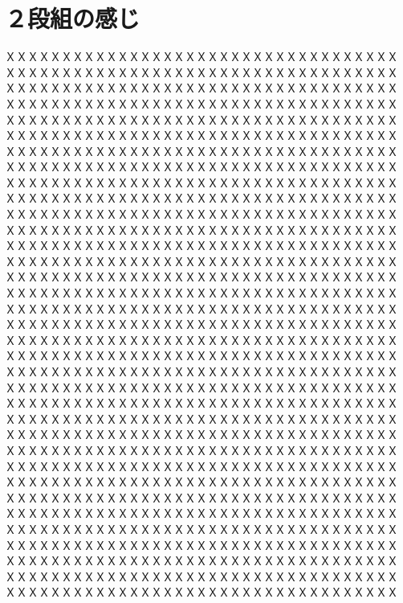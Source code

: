\documentclass[]{ltjsarticle}
\begin{document}
\section{２段組の感じ}
ＸＸＸＸＸＸＸＸＸＸＸＸＸＸＸＸＸＸＸＸＸＸＸＸＸＸＸＸＸＸＸＸＸＸＸ
ＸＸＸＸＸＸＸＸＸＸＸＸＸＸＸＸＸＸＸＸＸＸＸＸＸＸＸＸＸＸＸＸＸＸＸ
ＸＸＸＸＸＸＸＸＸＸＸＸＸＸＸＸＸＸＸＸＸＸＸＸＸＸＸＸＸＸＸＸＸＸＸ
ＸＸＸＸＸＸＸＸＸＸＸＸＸＸＸＸＸＸＸＸＸＸＸＸＸＸＸＸＸＸＸＸＸＸＸ
ＸＸＸＸＸＸＸＸＸＸＸＸＸＸＸＸＸＸＸＸＸＸＸＸＸＸＸＸＸＸＸＸＸＸＸ
ＸＸＸＸＸＸＸＸＸＸＸＸＸＸＸＸＸＸＸＸＸＸＸＸＸＸＸＸＸＸＸＸＸＸＸ
ＸＸＸＸＸＸＸＸＸＸＸＸＸＸＸＸＸＸＸＸＸＸＸＸＸＸＸＸＸＸＸＸＸＸＸ
ＸＸＸＸＸＸＸＸＸＸＸＸＸＸＸＸＸＸＸＸＸＸＸＸＸＸＸＸＸＸＸＸＸＸＸ
ＸＸＸＸＸＸＸＸＸＸＸＸＸＸＸＸＸＸＸＸＸＸＸＸＸＸＸＸＸＸＸＸＸＸＸ
ＸＸＸＸＸＸＸＸＸＸＸＸＸＸＸＸＸＸＸＸＸＸＸＸＸＸＸＸＸＸＸＸＸＸＸ
ＸＸＸＸＸＸＸＸＸＸＸＸＸＸＸＸＸＸＸＸＸＸＸＸＸＸＸＸＸＸＸＸＸＸＸ
ＸＸＸＸＸＸＸＸＸＸＸＸＸＸＸＸＸＸＸＸＸＸＸＸＸＸＸＸＸＸＸＸＸＸＸ
ＸＸＸＸＸＸＸＸＸＸＸＸＸＸＸＸＸＸＸＸＸＸＸＸＸＸＸＸＸＸＸＸＸＸＸ
ＸＸＸＸＸＸＸＸＸＸＸＸＸＸＸＸＸＸＸＸＸＸＸＸＸＸＸＸＸＸＸＸＸＸＸ
ＸＸＸＸＸＸＸＸＸＸＸＸＸＸＸＸＸＸＸＸＸＸＸＸＸＸＸＸＸＸＸＸＸＸＸ
ＸＸＸＸＸＸＸＸＸＸＸＸＸＸＸＸＸＸＸＸＸＸＸＸＸＸＸＸＸＸＸＸＸＸＸ
ＸＸＸＸＸＸＸＸＸＸＸＸＸＸＸＸＸＸＸＸＸＸＸＸＸＸＸＸＸＸＸＸＸＸＸ
ＸＸＸＸＸＸＸＸＸＸＸＸＸＸＸＸＸＸＸＸＸＸＸＸＸＸＸＸＸＸＸＸＸＸＸ
ＸＸＸＸＸＸＸＸＸＸＸＸＸＸＸＸＸＸＸＸＸＸＸＸＸＸＸＸＸＸＸＸＸＸＸ
ＸＸＸＸＸＸＸＸＸＸＸＸＸＸＸＸＸＸＸＸＸＸＸＸＸＸＸＸＸＸＸＸＸＸＸ
ＸＸＸＸＸＸＸＸＸＸＸＸＸＸＸＸＸＸＸＸＸＸＸＸＸＸＸＸＸＸＸＸＸＸＸ
ＸＸＸＸＸＸＸＸＸＸＸＸＸＸＸＸＸＸＸＸＸＸＸＸＸＸＸＸＸＸＸＸＸＸＸ
ＸＸＸＸＸＸＸＸＸＸＸＸＸＸＸＸＸＸＸＸＸＸＸＸＸＸＸＸＸＸＸＸＸＸＸ
ＸＸＸＸＸＸＸＸＸＸＸＸＸＸＸＸＸＸＸＸＸＸＸＸＸＸＸＸＸＸＸＸＸＸＸ
ＸＸＸＸＸＸＸＸＸＸＸＸＸＸＸＸＸＸＸＸＸＸＸＸＸＸＸＸＸＸＸＸＸＸＸ
ＸＸＸＸＸＸＸＸＸＸＸＸＸＸＸＸＸＸＸＸＸＸＸＸＸＸＸＸＸＸＸＸＸＸＸ
ＸＸＸＸＸＸＸＸＸＸＸＸＸＸＸＸＸＸＸＸＸＸＸＸＸＸＸＸＸＸＸＸＸＸＸ
ＸＸＸＸＸＸＸＸＸＸＸＸＸＸＸＸＸＸＸＸＸＸＸＸＸＸＸＸＸＸＸＸＸＸＸ
ＸＸＸＸＸＸＸＸＸＸＸＸＸＸＸＸＸＸＸＸＸＸＸＸＸＸＸＸＸＸＸＸＸＸＸ
ＸＸＸＸＸＸＸＸＸＸＸＸＸＸＸＸＸＸＸＸＸＸＸＸＸＸＸＸＸＸＸＸＸＸＸ
ＸＸＸＸＸＸＸＸＸＸＸＸＸＸＸＸＸＸＸＸＸＸＸＸＸＸＸＸＸＸＸＸＸＸＸ
ＸＸＸＸＸＸＸＸＸＸＸＸＸＸＸＸＸＸＸＸＸＸＸＸＸＸＸＸＸＸＸＸＸＸＸ
ＸＸＸＸＸＸＸＸＸＸＸＸＸＸＸＸＸＸＸＸＸＸＸＸＸＸＸＸＸＸＸＸＸＸＸ
ＸＸＸＸＸＸＸＸＸＸＸＸＸＸＸＸＸＸＸＸＸＸＸＸＸＸＸＸＸＸＸＸＸＸＸ
ＸＸＸＸＸＸＸＸＸＸＸＸＸＸＸＸＸＸＸＸＸＸＸＸＸＸＸＸＸＸＸＸＸＸＸ
\end{document}

